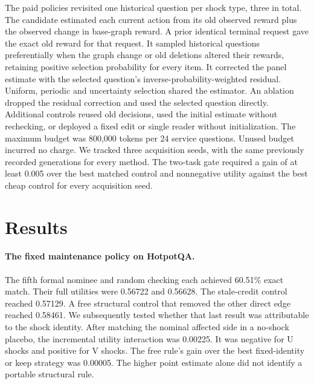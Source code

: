 \documentclass[11pt]{article}
\begin{document}
The paid policies revisited one historical question per shock type, three in total. The candidate estimated each current action from its old observed reward plus the observed change in base-graph reward. A prior identical terminal request gave the exact old reward for that request. It sampled historical questions preferentially when the graph change or old deletions altered their rewards, retaining positive selection probability for every item. It corrected the panel estimate with the selected question's inverse-probability-weighted residual. Uniform, periodic and uncertainty selection shared the estimator. An ablation dropped the residual correction and used the selected question directly. Additional controls reused old decisions, used the initial estimate without rechecking, or deployed a fixed edit or single reader without initialization. The maximum budget was 800,000 tokens per 24 service questions. Unused budget incurred no charge. We tracked three acquisition seeds, with the same previously recorded generations for every method. The two-task gate required a gain of at least 0.005 over the best matched control and nonnegative utility against the best cheap control for every acquisition seed.

\section{Results}
\paragraph{The fixed maintenance policy on HotpotQA.} The fifth formal nominee and random checking each achieved 60.51\% exact match. Their full utilities were 0.56722 and 0.56628. The stale-credit control reached 0.57129. A free structural control that removed the other direct edge reached 0.58461. We subsequently tested whether that last result was attributable to the shock identity. After matching the nominal affected side in a no-shock placebo, the incremental utility interaction was 0.00225. It was negative for U shocks and positive for V shocks. The free rule's gain over the best fixed-identity or keep strategy was 0.00005. The higher point estimate alone did not identify a portable structural rule.
\end{document}
